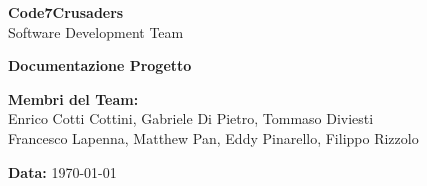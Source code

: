 \documentclass{article}
\begin{document}
\begin{titlepage}
    {\Huge \textbf{Code7Crusaders}}\\
    \vspace{0.5cm}
    {\Large Software Development Team}\\
    \vspace{2cm}
    
    {\large \textbf{Documentazione Progetto}}\\
    \vspace{5cm}

    \textbf{Membri del Team:}\\
    Enrico Cotti Cottini, Gabriele Di Pietro, Tommaso Diviesti \\
    Francesco Lapenna, Matthew Pan, Eddy Pinarello, Filippo Rizzolo \\
    \vspace{0.5cm}
    
    {\large \textbf{Data:}} \today\\
    
    \vspace{1cm}
\end{titlepage}

\newpage
\tableofcontents
\end{document}
